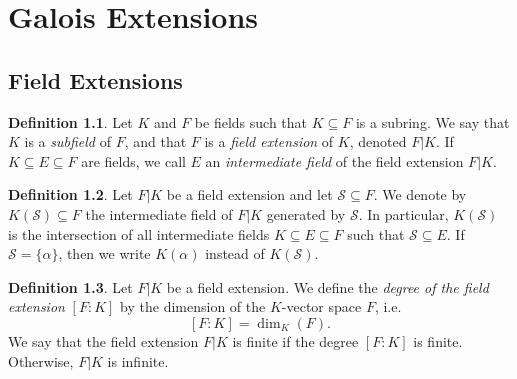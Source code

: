 \documentclass[a4paper, openany]{memoir}
\theoremstyle{definition}
\newtheorem{definition}{Definition}[section]
\theoremstyle{plain}
\begin{document}
    \chapter{Galois Extensions}
    \section{Field Extensions}
    \begin{definition}
        Let $K$ and $F$ be fields such that $K \subseteq F$ is a subring. We say that $K$ is a \emph{subfield} of $F$, and that $F$ is a \emph{field extension} of $K$, denoted $F|K$. If $K \subseteq E \subseteq F$ are fields, we call $E$ an \emph{intermediate field} of the field extension $F|K$.
    \end{definition}

    \begin{definition}
        Let $F|K$ be a field extension and let $\mathcal{S} \subseteq F$. We denote by $K(\mathcal{S}) \subseteq F$ the intermediate field of $F|K$ generated by $\mathcal{S}$. In particular, $K(\mathcal{S})$ is the intersection of all intermediate fields $K \subseteq E \subseteq F$ such that $\mathcal{S} \subseteq E$. If $\mathcal{S} = \{\alpha\}$, then we write $K(\alpha)$ instead of $K(\mathcal{S})$.
    \end{definition}

    \begin{definition}
        Let $F|K$ be a field extension. We define the \emph{degree of the field extension} $[F:K]$ by the dimension of the $K$-vector space $F$, i.e.
        \[[F : K] = \dim_K(F).\]
        We say that the field extension $F|K$ is finite if the degree $[F:K]$ is finite. Otherwise, $F|K$ is infinite.
    \end{definition}
\end{document}
